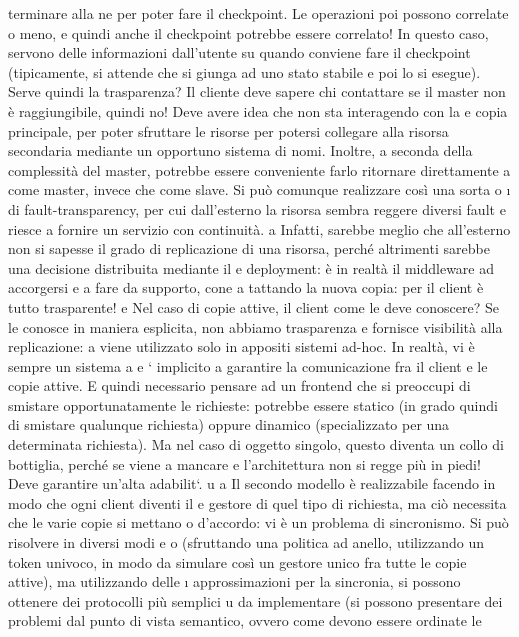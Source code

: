 terminare alla ne per poter fare il checkpoint.
Le operazioni poi possono correlate o meno, e quindi anche il checkpoint
potrebbe essere correlato! In questo caso, servono delle informazioni dall'utente
su quando conviene fare il checkpoint (tipicamente, si attende che si giunga ad
uno stato stabile e poi lo si esegue).
Serve quindi la trasparenza? Il cliente deve sapere chi contattare se il master
non è raggiungibile, quindi no! Deve avere idea che non sta interagendo con la
e
copia principale, per poter sfruttare le risorse per potersi collegare alla risorsa
secondaria mediante un opportuno sistema di nomi. Inoltre, a seconda della
complessità del master, potrebbe essere conveniente farlo ritornare direttamente
a
come master, invece che come slave. Si può comunque realizzare così una sorta
o
\i{}
di fault-transparency, per cui dall'esterno la risorsa sembra reggere diversi fault
e riesce a fornire un servizio con continuità.
a
Infatti, sarebbe meglio che all'esterno non si sapesse il grado di replicazione
di una risorsa, perché altrimenti sarebbe una decisione distribuita mediante il
e
deployment: è in realtà il middleware ad accorgersi e a fare da supporto, cone
a
tattando la nuova copia: per il client è tutto trasparente!
e
Nel caso di copie attive, il client come le deve conoscere? Se le conosce in
maniera esplicita, non abbiamo trasparenza e fornisce visibilità alla replicazione:
a
viene utilizzato solo in appositi sistemi ad-hoc. In realtà, vi è sempre un sistema
a
e
`
implicito a garantire la comunicazione fra il client e le copie attive. E quindi necessario pensare ad un frontend che
si preoccupi di smistare opportunatamente le
richieste: potrebbe essere statico (in grado quindi di smistare qualunque richiesta) oppure dinamico (specializzato per
una determinata richiesta). Ma nel caso
di oggetto singolo, questo diventa un collo di bottiglia, perché se viene a mancare
e
l'architettura non si regge più in piedi! Deve garantire un'alta adabilit`.
u
a
Il secondo modello è realizzabile facendo in modo che ogni client diventi il
e
gestore di quel tipo di richiesta, ma ciò necessita che le varie copie si mettano
o
d'accordo: vi è un problema di sincronismo. Si può risolvere in diversi modi
e
o
(sfruttando una politica ad anello, utilizzando un token univoco, in modo da
simulare così un gestore unico fra tutte le copie attive), ma utilizzando delle
\i{}
approssimazioni per la sincronia, si possono ottenere dei protocolli più semplici
u
da implementare (si possono presentare dei problemi dal punto di vista semantico, ovvero come devono essere ordinate le
